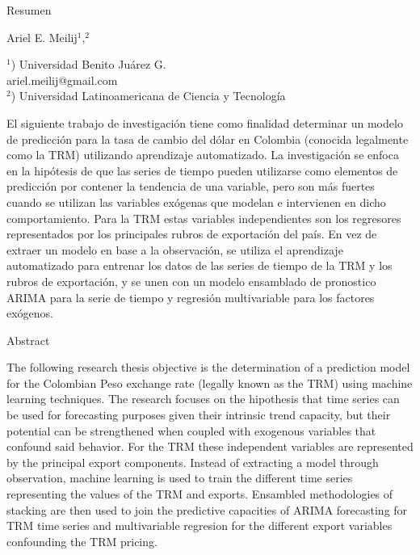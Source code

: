 
\Large
 \begin{center}
Resumen\\ 
\hspace{5pt}

\large
Ariel E. Meilij$^1,^2$  \\
\hspace{5pt}

\small  
$^1$) Universidad Benito Juárez G.\\
ariel.meilij@gmail.com\\
$^2$) Universidad Latinoamericana de Ciencia y Tecnología
\end{center}
\hspace{5pt}

\normalsize
El siguiente trabajo de investigación tiene como finalidad determinar un modelo de predicción para la tasa de cambio del dólar en Colombia (conocida legalmente como la TRM) utilizando aprendizaje automatizado. La investigación se enfoca en la hipótesis de que las series de tiempo pueden utilizarse como elementos de predicción por contener la tendencia de una variable, pero son más fuertes cuando se utilizan las variables exógenas que modelan e intervienen en dicho comportamiento. Para la TRM estas variables independientes son los regresores representados por los principales rubros de exportación del país. En vez de extraer un modelo en base a la observación, se utiliza el aprendizaje automatizado para entrenar los datos de las series de tiempo de la TRM y los rubros de exportación, y se unen con un modelo ensamblado de pronostico ARIMA para la serie de tiempo y regresión multivariable para los factores exógenos. 

\hspace{10pt}

\Large
 \begin{center}
Abstract\\ 
\hspace{5pt}
\end{center}

\normalsize
The following research thesis objective is the determination of a prediction model for the Colombian Peso exchange rate (legally known as the TRM) using machine learning techniques. The research focuses on the hipothesis that time series can be used for forecasting purposes given their intrinsic trend capacity, but their potential can be strengthened when coupled with exogenous variables that confound said behavior. For the TRM these independent variables are represented by the principal export components. Instead of extracting a model through observation, machine learning is used to train the different time series representing the values of the TRM and exports. Ensambled methodologies of stacking are then used to join the predictive capacities of ARIMA forecasting for TRM time series and multivariable regresion for the different export variables confounding the TRM pricing.